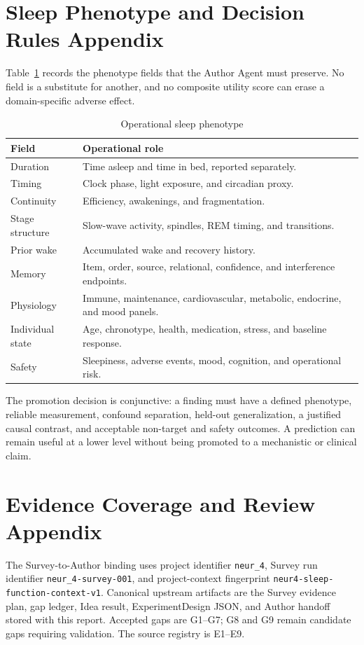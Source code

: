 \documentclass[conference]{IEEEtran}
\begin{document}
\appendices
\section{Sleep Phenotype and Decision Rules Appendix}
Table~\ref{tab:phenotype} records the phenotype fields that the Author Agent must preserve. No field is a substitute for another, and no composite utility score can erase a domain-specific adverse effect.

\begin{table}[h]
\caption{Operational sleep phenotype}
\label{tab:phenotype}
\centering
\footnotesize
\setlength{\tabcolsep}{2pt}
\begin{tabular}{p{}p{}}
\toprule
Field & Operational role \\
\midrule
Duration & Time asleep and time in bed, reported separately. \\
Timing & Clock phase, light exposure, and circadian proxy. \\
Continuity & Efficiency, awakenings, and fragmentation. \\
Stage structure & Slow-wave activity, spindles, REM timing, and transitions. \\
Prior wake & Accumulated wake and recovery history. \\
Memory & Item, order, source, relational, confidence, and interference endpoints. \\
Physiology & Immune, maintenance, cardiovascular, metabolic, endocrine, and mood panels. \\
Individual state & Age, chronotype, health, medication, stress, and baseline response. \\
Safety & Sleepiness, adverse events, mood, cognition, and operational risk. \\
\bottomrule
\end{tabular}
\end{table}

The promotion decision is conjunctive: a finding must have a defined phenotype, reliable measurement, confound separation, held-out generalization, a justified causal contrast, and acceptable non-target and safety outcomes. A prediction can remain useful at a lower level without being promoted to a mechanistic or clinical claim.

\section{Evidence Coverage and Review Appendix}
The Survey-to-Author binding uses project identifier \texttt{neur\_4}, Survey run identifier \texttt{neur\_4-survey-001}, and project-context fingerprint \texttt{neur4-sleep-function-context-v1}. Canonical upstream artifacts are the Survey evidence plan, gap ledger, Idea result, ExperimentDesign JSON, and Author handoff stored with this report. Accepted gaps are G1--G7; G8 and G9 remain candidate gaps requiring validation. The source registry is E1--E9.
\end{document}
